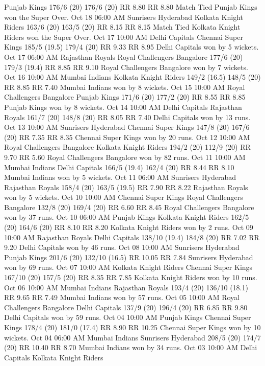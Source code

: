 Punjab Kings
176/6 (20)
176/6 (20)
RR 8.80
RR 8.80
Match Tied Punjab Kings won the Super Over.
Oct 18
06:00 AM
Sunrisers Hyderabad
Kolkata Knight Riders
163/6 (20)
163/5 (20)
RR 8.15
RR 8.15
Match Tied Kolkata Knight Riders won the Super Over.
Oct 17
10:00 AM
Delhi Capitals
Chennai Super Kings
185/5 (19.5)
179/4 (20)
RR 9.33
RR 8.95
Delhi Capitals won by 5 wickets.
Oct 17
06:00 AM
Rajasthan Royals
Royal Challengers Bangalore
177/6 (20)
179/3 (19.4)
RR 8.85
RR 9.10
Royal Challengers Bangalore won by 7 wickets.
Oct 16
10:00 AM
Mumbai Indians
Kolkata Knight Riders
149/2 (16.5)
148/5 (20)
RR 8.85
RR 7.40
Mumbai Indians won by 8 wickets.
Oct 15
10:00 AM
Royal Challengers Bangalore
Punjab Kings
171/6 (20)
177/2 (20)
RR 8.55
RR 8.85
Punjab Kings won by 8 wickets.
Oct 14
10:00 AM
Delhi Capitals
Rajasthan Royals
161/7 (20)
148/8 (20)
RR 8.05
RR 7.40
Delhi Capitals won by 13 runs.
Oct 13
10:00 AM
Sunrisers Hyderabad
Chennai Super Kings
147/8 (20)
167/6 (20)
RR 7.35
RR 8.35
Chennai Super Kings won by 20 runs.
Oct 12
10:00 AM
Royal Challengers Bangalore
Kolkata Knight Riders
194/2 (20)
112/9 (20)
RR 9.70
RR 5.60
Royal Challengers Bangalore won by 82 runs.
Oct 11
10:00 AM
Mumbai Indians
Delhi Capitals
166/5 (19.4)
162/4 (20)
RR 8.44
RR 8.10
Mumbai Indians won by 5 wickets.
Oct 11
06:00 AM
Sunrisers Hyderabad
Rajasthan Royals
158/4 (20)
163/5 (19.5)
RR 7.90
RR 8.22
Rajasthan Royals won by 5 wickets.
Oct 10
10:00 AM
Chennai Super Kings
Royal Challengers Bangalore
132/8 (20)
169/4 (20)
RR 6.60
RR 8.45
Royal Challengers Bangalore won by 37 runs.
Oct 10
06:00 AM
Punjab Kings
Kolkata Knight Riders
162/5 (20)
164/6 (20)
RR 8.10
RR 8.20
Kolkata Knight Riders won by 2 runs.
Oct 09
10:00 AM
Rajasthan Royals
Delhi Capitals
138/10 (19.4)
184/8 (20)
RR 7.02
RR 9.20
Delhi Capitals won by 46 runs.
Oct 08
10:00 AM
Sunrisers Hyderabad
Punjab Kings
201/6 (20)
132/10 (16.5)
RR 10.05
RR 7.84
Sunrisers Hyderabad won by 69 runs.
Oct 07
10:00 AM
Kolkata Knight Riders
Chennai Super Kings
167/10 (20)
157/5 (20)
RR 8.35
RR 7.85
Kolkata Knight Riders won by 10 runs.
Oct 06
10:00 AM
Mumbai Indians
Rajasthan Royals
193/4 (20)
136/10 (18.1)
RR 9.65
RR 7.49
Mumbai Indians won by 57 runs.
Oct 05
10:00 AM
Royal Challengers Bangalore
Delhi Capitals
137/9 (20)
196/4 (20)
RR 6.85
RR 9.80
Delhi Capitals won by 59 runs.
Oct 04
10:00 AM
Punjab Kings
Chennai Super Kings
178/4 (20)
181/0 (17.4)
RR 8.90
RR 10.25
Chennai Super Kings won by 10 wickets.
Oct 04
06:00 AM
Mumbai Indians
Sunrisers Hyderabad
208/5 (20)
174/7 (20)
RR 10.40
RR 8.70
Mumbai Indians won by 34 runs.
Oct 03
10:00 AM
Delhi Capitals
Kolkata Knight Riders

